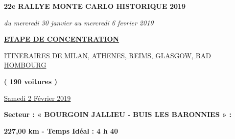 \documentclass{article}%
\begin{document}
%
\normalsize%
\begin{center} \textbf{\LARGE{22e RALLYE MONTE CARLO HISTORIQUE 2019}} \end{center}%
\begin{center} \textit{du mercredi 30 janvier au mercredi 6 fevrier 2019} \end{center}%
\begin{center} \textbf{\underline{ETAPE DE CONCENTRATION}} \end{center}%
\begin{center} \underline{ITINERAIRES DE MILAN, ATHENES, REIMS, GLASGOW, BAD HOMBOURG} \end{center}%
\begin{center} \textbf{( 190 voitures )} \end{center}%
\begin{flushright} \underline{ Samedi 2 Février 2019} \end{flushright}%
\begin{flushleft} \textbf{Secteur : « BOURGOIN  JALLIEU - BUIS LES BARONNIES » :
} \end{flushleft}%
\begin{flushright} \textbf{227,00 km - Temps Idéal : 4 h 40} \end{flushright}%
\end{document}

